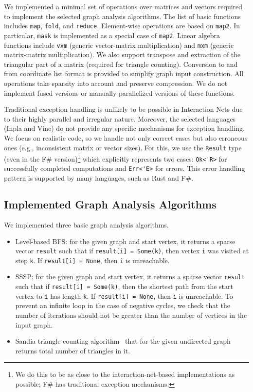 We implemented a minimal set of operations over matrices and vectors required to implement the selected graph analysis algorithms.
The list of basic functions includes \verb|map|, \verb|fold|, and \verb|reduce|.
Element-wise operations are based on \verb|map2|.
In particular, \verb|mask| is implemented as a special case of \verb|map2|.
Linear algebra functions include \verb|vxm| (generic vector-matrix multiplication) and \verb|mxm| (generic matrix-matrix multiplication).
We also support transpose and extraction of the triangular part of a matrix (required for triangle counting).
Conversion to and from coordinate list format is provided to simplify graph input construction.
All operations take sparsity into account and preserve compression.
We do not implement fused versions or manually parallelized versions of these functions.

Traditional exception handling is unlikely to be possible in Interaction Nets due to their highly parallel and irregular nature.
Moreover, the selected languages (Inpla and Vine) do not provide any specific mechanisms for exception handling.
We focus on realistic code, so we handle not only correct cases but also erroneous ones (e.g., inconsistent matrix or vector sizes).
For this, we use the \verb|Result| type (even in the F\# version)\footnote{We do this to be as close to the interaction-net-based implementations as possible; F\# has traditional exception mechanisms.} which explicitly represents two cases: \verb|Ok<'R>| for successfully completed computations and \verb|Err<'E>| for errors. 
This error handling pattern is supported by many languages, such as Rust and F\#.


\subsection{Implemented Graph Analysis Algorithms}\label{sec:graph_algorithms}

We implemented three basic graph analysis algorithms.
\begin{itemize}
    \item Level-based BFS: for the given graph and start vertex, it returns a sparse vector \verb|result| such that if \verb|result[i] = Some(k)|, then vertex \verb|i| was visited at step \verb|k|.
    If \verb|result[i] = None|, then \verb|i| is unreachable.
    \item SSSP: for the given graph and start vertex, it returns a sparse vector \verb|result| such that if \verb|result[i] = Some(k)|, then the shortest path from the start vertex to \verb|i| has length \verb|k|.
    If \verb|result[i] = None|, then \verb|i| is unreachable. 
    To prevent an infinite loop in the case of negative cycles, we check that the number of iterations should not be greater than the number of vertices in the input graph.
    \item Sandia triangle counting algorithm~\cite{wolf2017kktri} that for the given undirected graph returns total number of triangles in it.
\end{itemize}

